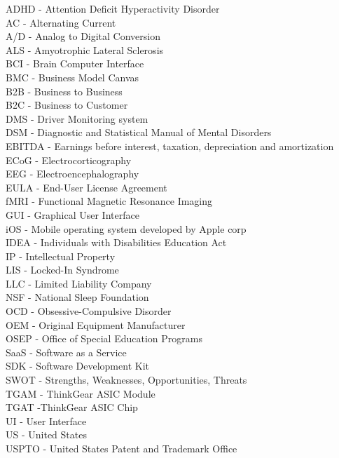 \documentclass[letterpaper,10pt]{article}
\begin{document}
\noindent ADHD - Attention Deficit Hyperactivity Disorder \\
AC -  Alternating Current \\
A/D - Analog to Digital Conversion \\
ALS - Amyotrophic Lateral Sclerosis \\
BCI - Brain Computer Interface \\
BMC - Business Model Canvas \\
B2B - Business to Business \\
B2C - Business to Customer \\
DMS - Driver Monitoring system \\
DSM - Diagnostic and Statistical Manual of Mental Disorders \\
EBITDA - Earnings before interest, taxation, depreciation and amortization \\
ECoG - Electrocorticography \\
EEG - Electroencephalography \\
EULA - End-User License Agreement \\
fMRI - Functional Magnetic Resonance Imaging \\
GUI - Graphical User Interface \\
iOS - Mobile operating system developed by Apple corp \\
IDEA - Individuals with Disabilities Education Act \\
IP - Intellectual Property \\
LIS - Locked-In Syndrome \\ 
LLC - Limited Liability Company \\
NSF - National Sleep Foundation \\
OCD - Obsessive-Compulsive Disorder \\
OEM - Original Equipment Manufacturer  \\
OSEP - Office of Special Education Programs \\
SaaS - Software as a Service \\
SDK - Software Development Kit \\
SWOT - Strengths, Weaknesses, Opportunities, Threats \\
TGAM - ThinkGear ASIC Module \\
TGAT -ThinkGear ASIC Chip \\
UI - User Interface \\
US - United States \\
USPTO - United States Patent and Trademark Office \\
\end{document}
